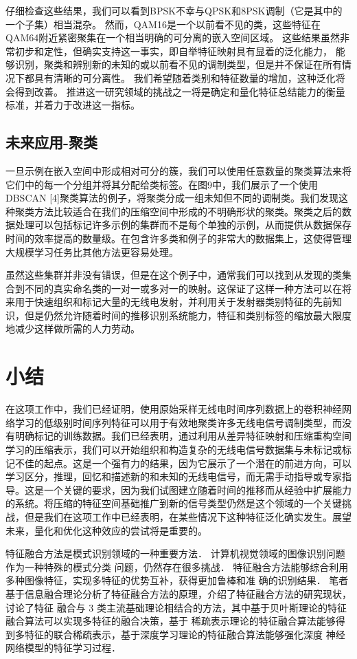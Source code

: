 仔细检查这些结果，我们可以看到BPSK不幸与QPSK和8PSK调制（它是其中的一个子集）相当混杂。
然而，QAM16是一个以前看不见的类，这些特征在QAM64附近紧密聚集在一个相当明确的可分离的嵌入空间区域。
这些结果虽然非常初步和定性，但确实支持这一事实，即自举特征映射具有显着的泛化能力，
能够识别，聚类和辨别新的未知的或以前看不见的调制类型，但是并不保证在所有情况下都具有清晰的可分离性。
我们希望随着类别和特征数量的增加，这种泛化将会得到改善。
推进这一研究领域的挑战之一将是确定和量化特征总结能力的衡量标准，并着力于改进这一指标。\par

\subsection{未来应用-聚类}
一旦示例在嵌入空间中形成相对可分的簇，我们可以使用任意数量的聚类算法来将它们中的每一个分组并将其分配给类标签。在图9中，我们展示了一个使用DBSCAN [4]聚类算法的例子，将聚类分成一组未知但不同的调制类。我们发现这种聚类方法比较适合在我们的压缩空间中形成的不明确形状的聚类。聚类之后的数据处理可以包括标记许多示例的集群而不是每个单独的示例，从而提供从数据保存时间的效率提高的数量级。在包含许多类和例子的非常大的数据集上，这使得管理大规模学习任务比其他方法更容易处理。\par
虽然这些集群并非没有错误，但是在这个例子中，通常我们可以找到从发现的类集合到不同的真实命名类的一对一或多对一的映射。这保证了这样一种方法可以在将来用于快速组织和标记大量的无线电发射，并利用关于发射器类别特征的先前知识，但是仍然允许随着时间的推移识别系统能力，特征和类别标签的缩放最大限度地减少这样做所需的人力劳动。\par


\section{小结}
在这项工作中，我们已经证明，使用原始采样无线电时间序列数据上的卷积神经网络学习的低级别时间序列特征可以用于有效地聚类许多无线电信号调制类型，而没有明确标记的训练数据。我们已经表明，通过利用从差异特征映射和压缩重构空间学习的压缩表示，我们可以开始组织和构造复杂的无线电信号数据集与未标记或标记不佳的起点。这是一个强有力的结果，因为它展示了一个潜在的前进方向，可以学习区分，推理，回忆和描述新的和未知的无线电信号，而无需手动指导或专家指导。这是一个关键的要求，因为我们试图建立随着时间的推移而从经验中扩展能力的系统。将压缩的特征空间基础推广到新的信号类型仍然是这个领域的一个关键挑战，但是我们在这项工作中已经表明，在某些情况下这种特征泛化确实发生。展望未来，量化和优化这种效应的尝试将是重要的。\par

特征融合方法是模式识别领域的一种重要方法． 计算机视觉领域的图像识别问题作为一种特殊的模式分类
问题，仍然存在很多挑战． 特征融合方法能够综合利用多种图像特征，实现多特征的优势互补，获得更加鲁棒和准
确的识别结果． 笔者基于信息融合理论分析了特征融合方法的原理，介绍了特征融合方法的研究现状，讨论了特征
融合与 3 类主流基础理论相结合的方法，其中基于贝叶斯理论的特征融合算法可以实现多特征的融合决策，基于
稀疏表示理论的特征融合算法能够得到多特征的联合稀疏表示，基于深度学习理论的特征融合算法能够强化深度
神经网络模型的特征学习过程．\par
